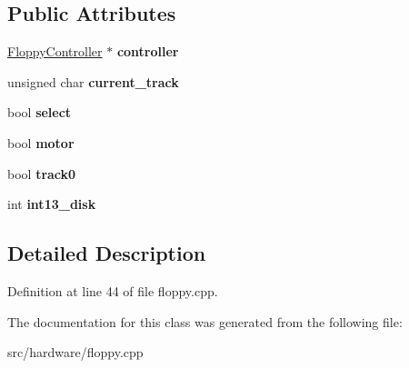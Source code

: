 \subsection*{Public Attributes}
\begin{DoxyCompactItemize}
\item 
\hypertarget{classFloppyDevice_a8ffa0135f4b836426a32b96680dc51a0}{\hyperlink{classFloppyController}{Floppy\-Controller} $\ast$ {\bfseries controller}}\label{classFloppyDevice_a8ffa0135f4b836426a32b96680dc51a0}

\item 
\hypertarget{classFloppyDevice_a34366d0b663e4c660875c22b1f7efa8b}{unsigned char {\bfseries current\-\_\-track}}\label{classFloppyDevice_a34366d0b663e4c660875c22b1f7efa8b}

\item 
\hypertarget{classFloppyDevice_a7af7286e2e7558074b0853a10a37d80f}{bool {\bfseries select}}\label{classFloppyDevice_a7af7286e2e7558074b0853a10a37d80f}

\item 
\hypertarget{classFloppyDevice_a00f5510f11e8fad3b0233c9d3b293fd7}{bool {\bfseries motor}}\label{classFloppyDevice_a00f5510f11e8fad3b0233c9d3b293fd7}

\item 
\hypertarget{classFloppyDevice_a81025c10fec2b1d3f39cba566c89d796}{bool {\bfseries track0}}\label{classFloppyDevice_a81025c10fec2b1d3f39cba566c89d796}

\item 
\hypertarget{classFloppyDevice_aea6d0c8cb2f60c2cc106b0c722d2f8de}{int {\bfseries int13\-\_\-disk}}\label{classFloppyDevice_aea6d0c8cb2f60c2cc106b0c722d2f8de}

\end{DoxyCompactItemize}


\subsection{Detailed Description}


Definition at line 44 of file floppy.\-cpp.



The documentation for this class was generated from the following file\-:\begin{DoxyCompactItemize}
\item 
src/hardware/floppy.\-cpp\end{DoxyCompactItemize}
